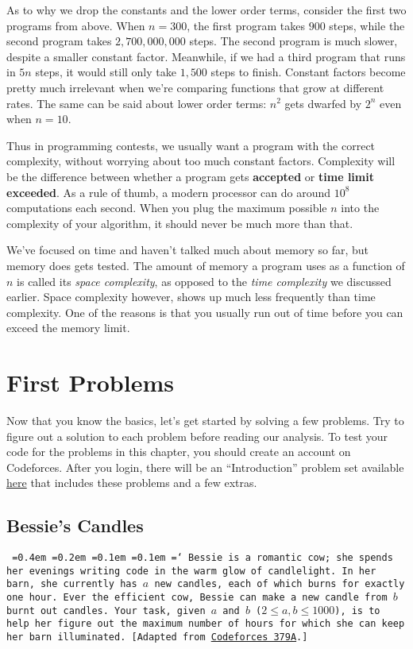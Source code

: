 As to why we drop the constants and the lower order terms, consider the first two programs from above. When $n=300$, the first program takes $900$ steps, while the second program takes $2,700,000,000$ steps. The second program is much slower, despite a smaller constant factor. Meanwhile, if we had a third program that runs in $5n$ steps, it would still only take $1,500$ steps to finish. Constant factors become pretty much irrelevant when we're comparing functions that grow at different rates. The same can be said about lower order terms: $n^2$ gets dwarfed by $2^n$ even when $n=10$.

Thus in programming contests, we usually want a program with the correct complexity, without worrying about too much constant factors. Complexity will be the difference between whether a program gets \textbf{\color{green}accepted} or \textbf{\color{red}time limit exceeded}. As a rule of thumb, a modern processor can do around $10^8$ computations each second. When you plug the maximum possible $n$ into the complexity of your algorithm, it should never be much more than that.

We've focused on time and haven't talked much about memory so far, but memory does gets tested. The amount of memory a program uses as a function of $n$ is called its \emph{space complexity}, as opposed to the \emph{time complexity} we discussed earlier. Space complexity however, shows up much less frequently than time complexity. One of the reasons is that you usually run out of time before you can exceed the memory limit.

\section{First Problems}

Now that you know the basics, let's get started by solving a few problems. Try to figure out a solution to each problem before reading our analysis. To test your code for the problems in this chapter, you should create an account on Codeforces. After you login, there will be an ``Introduction'' problem set available \href{http://codeforces.com/group/iMPx86rZXm/contests}{here} that includes these problems and a few extras.

\subsection{Bessie's Candles}

\texttt{
  \font=0.4em%
  \font=0.2em%
  \font=0.1em%
  \font=0.1em%
  \hyphenchar\font=`\-%
  Bessie is a romantic cow; she spends her evenings writing code in the warm glow of candlelight. In her barn, she currently has $a$ new candles, each of which burns for exactly one hour. Ever the efficient cow, Bessie can make a new candle from $b$ burnt out candles. Your task, given $a$ and $b$ ($2 \le a, b \le 1000$), is to help her figure out the maximum number of hours for which she can keep her barn illuminated. [Adapted from \href{http://codeforces.com/problemset/problem/379/A}{Codeforces 379A}.]
}

